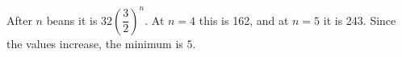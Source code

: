 After $n$ beans it is $32(\dfrac{3}{2})^n$. At $n=4$ this is 162, and at $n=5$ it is 243. Since the values increase, the minimum is $\boxed5$.
